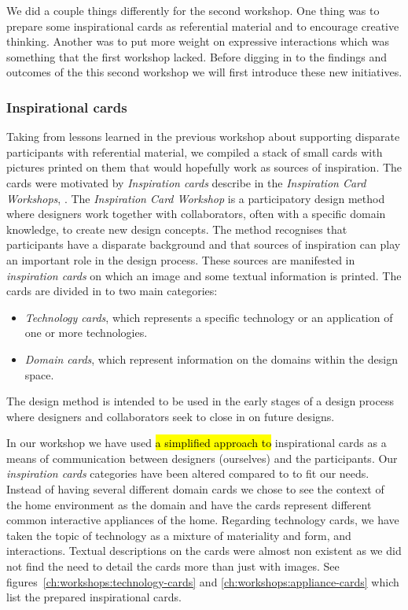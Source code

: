 We did a couple things differently for the second workshop.
One thing was to prepare some inspirational cards as referential material and to encourage creative thinking.
Another was to put more weight on expressive interactions which was something that the first workshop lacked.
Before digging in to the findings and outcomes of the this second workshop we will first introduce these new initiatives.

\subsubsection{Inspirational cards}
\label{ch:workshops:workshop-ii:inspiration-cards}
Taking from lessons learned in the previous workshop about supporting disparate participants with referential material, we compiled a stack of small cards with pictures printed on them that would hopefully work as sources of inspiration.
The cards were motivated by \emph{Inspiration cards} describe in the \emph{Inspiration Card Workshops}, \citep{halskov2006inspiration}.
The \emph{Inspiration Card Workshop} is a participatory design method where designers work together with collaborators, often with a specific domain knowledge, to create new design concepts.
The method recognises that participants have a disparate background and that sources of inspiration can play an important role in the design process.
These sources are manifested in \emph{inspiration cards} on which an image and some textual information is printed.
The cards are divided in to two main categories:
\begin{itemize}
  \item{\emph{Technology cards}, which represents a specific technology or an application of one or more technologies.}
  \item{\emph{Domain cards}, which represent information on the domains within the design space.}
\end{itemize}


The design method is intended to be used in the early stages of a design process where designers and collaborators seek to close in on future designs.

In our workshop we have used \hl{a simplified approach to} inspirational cards as a means of communication between designers (ourselves) and the participants.
Our \emph{inspiration cards} categories have been altered compared to \citep{halskov2006inspiration} to fit our needs.
Instead of having several different domain cards we chose to see the context of the home environment as the domain and have the cards represent different common interactive appliances of the home.
Regarding technology cards, we have taken the topic of technology as a mixture of materiality and form, and interactions.
Textual descriptions on the cards were almost non existent as we did not find the need to detail the cards more than just with images.
See figures~\ref{ch:workshops:technology-cards} and \ref{ch:workshops:appliance-cards} which list the prepared inspirational cards.

